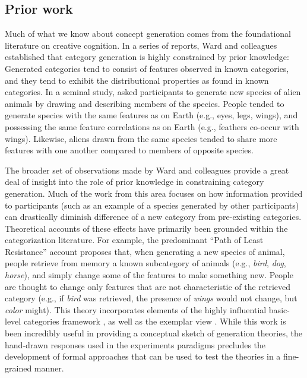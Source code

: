 \documentclass[12pt]{article}
\begin{document}
\begin{flushleft}
\section{Prior work}

Much of what we know about concept generation comes from the foundational
literature on creative cognition. In a series of reports, Ward and colleagues
\citep{ward1995s,ward1994structured,marsh1999inadvertent,ward2002role,smith1993constraining}
established that category generation is highly constrained by prior knowledge:
Generated categories tend to consist of features observed in known categories,
and they tend to exhibit the distributional properties as found in known
categories. In a seminal study, \cite{ward1994structured} asked participants to
generate new species of alien animals by drawing and describing members of the
species. People tended to generate species with the same features as on Earth
(e.g., eyes, legs, wings), and possessing the same feature correlations as on
Earth (e.g., feathers co-occur with wings). Likewise, aliens drawn from the same
species tended to share more features with one another compared to members of
opposite species.

The broader set of observations made by Ward and colleagues provide a great deal
of insight into the role of prior knowledge in constraining category generation.
Much of the work from this area
\citep[e.g.,][]{smith1993constraining,marsh1999inadvertent} focuses on how
information provided to participants (such as an example of a species generated
by other participants) can drastically diminish difference of a new category
from pre-existing categories. Theoretical accounts of these effects have
primarily been grounded within the categorization literature. For example, the
predominant ``Path of Least Resistance'' account
\citep[see][]{ward1994structured,ward1995s,ward2002role} proposes that, when
generating a new species of animal, people retrieve from memory a known
subcategory of animals (e.g., {\em bird}, {\em dog}, {\em horse}), and simply
change some of the features to make something new. People are thought to change
only features that are not characteristic of the retrieved category (e.g., if
{\em bird} was retrieved, the presence of {\em wings} would not change, but {\em
color} might). This theory incorporates elements of the highly influential
basic-level categories framework \citep{rosch1975cognitive,rosch1976basic}, as
well as the exemplar view \citep{medin1978context,brooks1978nonanalytic}. While
this work is been incredibly useful in providing a conceptual sketch of
generation theories, the hand-drawn responses used in the experiments paradigms
precludes the development of formal approaches that can be used to test the
theories in a fine-grained manner.


\end{flushleft}
\end{document}
